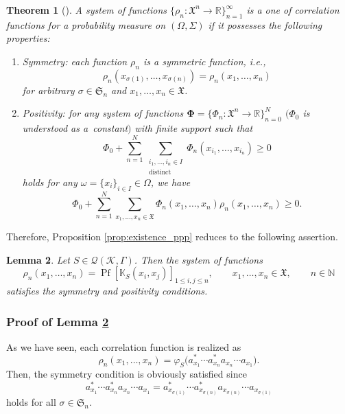 \documentclass[pdftex]{sigma}
\numberwithin{equation}{section}
\newtheorem{Theorem}{Theorem}[section]
\newtheorem{Lemma}[Theorem]{Lemma}
\newcommand{\pf}{\operatorname{Pf}}
\newcommand{\mfrak}[1]{\mathfrak{#1}}
\newcommand{\mcal}[1]{\mathcal{#1}}
\newcommand{\mbb}[1]{\mathbb{#1}}
\newcommand{\mrm}[1]{\mathrm{#1}}
\begin{document}
\begin{Theorem}[\cite{Lenard1975a, Lenard1975b}]
A system of functions $\big\{\rho_{n}\colon \mfrak{X}^{n}\to\mbb{R}\big\}_{n=1}^{\infty}$ is a one of correlation functions for a probability measure on $(\Omega,\Sigma)$ if it possesses the following properties:
\begin{enumerate}\itemsep=0pt
\item[$1.$] {\it Symmetry:} each function $\rho_{n}$ is a symmetric function, i.e.,
	\begin{equation*}
		\rho_{n}(x_{\sigma (1)},\dots, x_{\sigma (n)})=\rho_{n}(x_{1},\dots, x_{n})
	\end{equation*}
	for arbitrary $\sigma\in\mfrak{S}_{n}$ and $x_{1},\dots, x_{n}\in\mfrak{X}$.
\item[$2.$] {\it Positivity:} for any system of functions $\bm{\Phi}=\big\{\Phi_{n}\colon \mfrak{X}^{n}\to\mbb{R}\big\}_{n=0}^{N}$ $(\Phi_{0}$ is understood as a~constant$)$ with finite support such that
	\begin{equation}\label{eq:positivity_test_function}
		\Phi_{0}+\sum_{n=1}^{N}\sum_{\substack{i_{1},\dots,i_{n}\in I \\ \mrm{distinct}}}\Phi_{n}(x_{i_{1}},\dots, x_{i_{n}})\ge 0
	\end{equation}
	holds for any $\omega=\{x_{i}\}_{i\in I}\in\Omega$, we have
	\begin{equation*}
		\Phi_{0}+\sum_{n=1}^{N}\sum_{x_{1},\dots, x_{n}\in\mfrak{X}}\Phi_{n}(x_{1},\dots, x_{n})\rho_{n}(x_{1},\dots, x_{n})\ge 0.
	\end{equation*}
\end{enumerate}
\end{Theorem}

Therefore, Proposition \ref{prop:existence_ppp} reduces to the following assertion.
\begin{Lemma}
\label{lem:existence_ppp}
Let $S\in\mcal{Q}(\mcal{K},\Gamma)$. Then the system of functions
\begin{equation*}
	\rho_{n}(x_{1},\dots, x_{n})=\pf \left[\mbb{K}_{S}(x_{i},x_{j})\right]_{1\le i,j\le n}, \qquad x_{1},\dots, x_{n}\in\mfrak{X}, \qquad n\in\mbb{N}
\end{equation*}
satisfies the symmetry and positivity conditions.
\end{Lemma}

\subsubsection{Proof of Lemma \ref{lem:existence_ppp}}
As we have seen, each correlation function is realized as
\begin{equation*}
	\rho_{n}(x_{1},\dots, x_{n})=\varphi_{S}\big(a_{x_{1}}^{\ast}\cdots a_{x_{n}}^{\ast}a_{x_{n}}\cdots a_{x_{1}}\big).
\end{equation*}
Then, the symmetry condition is obviously satisfied since
\begin{equation*}
	a_{x_{1}}^{\ast}\cdots a_{x_{n}}^{\ast}a_{x_{n}}\cdots a_{x_{1}}
	=a_{x_{\sigma (1)}}^{\ast}\cdots a_{x_{\sigma (n)}}^{\ast}a_{x_{\sigma (n)}}\cdots a_{x_{\sigma (1)}}
\end{equation*}
holds for all $\sigma\in\mfrak{S}_{n}$.
\end{document}
